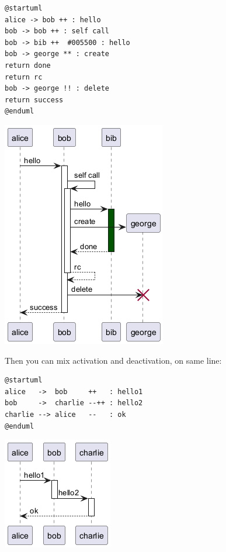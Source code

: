 \begin{verbatim}
@startuml
alice -> bob ++ : hello
bob -> bob ++ : self call
bob -> bib ++  #005500 : hello
bob -> george ** : create
return done
return rc
bob -> george !! : delete
return success
@enduml
\end{verbatim}
\begin{center}
\includegraphics[scale=0.60]{imgw/img-18d920168f7f8816c053fdaa158b7a38.png}
\end{center}


Then you can mix activation and deactivation, on same line:
\begin{verbatim}
@startuml
alice   ->  bob     ++   : hello1
bob     ->  charlie --++ : hello2
charlie --> alice   --   : ok
@enduml
\end{verbatim}
\begin{center}
\includegraphics[scale=0.60]{imgw/img-524410099bd22fe6c46a82ea48c3a016.png}
\end{center}


